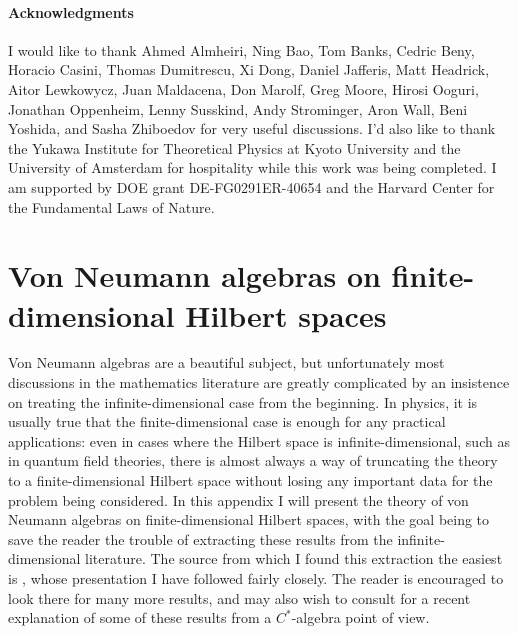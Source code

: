 \documentclass[12pt]{article}
\begin{document}
\paragraph{Acknowledgments} I would like to thank Ahmed Almheiri, Ning Bao, Tom Banks, Cedric Beny, Horacio Casini, Thomas Dumitrescu, Xi Dong, Daniel Jafferis, Matt Headrick, Aitor Lewkowycz, Juan Maldacena, Don Marolf, Greg Moore, Hirosi Ooguri, Jonathan Oppenheim, Lenny Susskind, Andy Strominger, Aron Wall, Beni Yoshida, and Sasha Zhiboedov for very useful discussions. I'd also like to thank the Yukawa Institute for Theoretical Physics at Kyoto University and the University of Amsterdam for hospitality while this work was being completed.  I am supported by DOE grant  DE-FG0291ER-40654 and the Harvard Center for the Fundamental Laws of Nature.
  
\appendix
\section{Von Neumann algebras on finite-dimensional Hilbert spaces}\label{vnapp}
Von Neumann algebras are a beautiful subject, but unfortunately most discussions in the mathematics literature are greatly complicated by an insistence on treating the infinite-dimensional case from the beginning.  In physics, it is usually true that the finite-dimensional case is enough for any practical applications: even in cases where the Hilbert space is infinite-dimensional, such as in quantum field theories, there is almost always a way of truncating the theory to a finite-dimensional Hilbert space without losing any important data for the problem being considered.  In this appendix I will present the theory of von Neumann algebras on finite-dimensional Hilbert spaces, with the goal being to save the reader the trouble of extracting these results from the infinite-dimensional literature.  The source from which I found this extraction the easiest is \cite{Jones}, whose presentation I have followed fairly closely.  The reader is encouraged to look there for many more results, and may also wish to consult \cite{beny2015algebraic} for a recent explanation of some of these results from a $C^*$-algebra point of view. 
\end{document}
